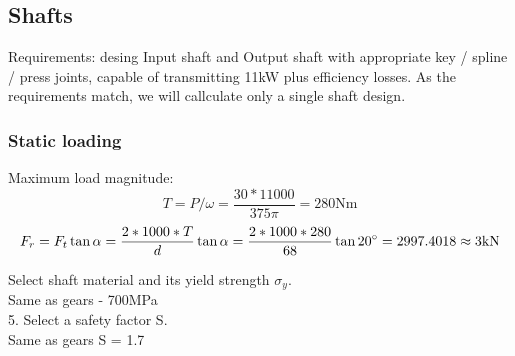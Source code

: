 \documentclass{article}
\begin{document}
\subsection{Shafts}
Requirements: desing Input shaft and Output shaft with appropriate key / spline / press  joints, capable of transmitting 11kW plus efficiency losses.
As the requirements match, we will callculate only a single shaft design.
\subsubsection{Static loading}


Maximum load magnitude: \\
$$T = P / \omega = \frac{30*11000}{375 \pi} = 280 \si{\newton}\si{\meter}$$
$$ F_r = F_t \tan \alpha = \frac{2* 1000* T}{d} \tan \alpha = \frac{2 * 1000 * 280}{68} \tan 20 \degree = 2997.4018 \approx 3 \si{\kilo\newton}$$

Select shaft material and its yield strength $\sigma_y$. \\
Same as gears - 700MPa \\

5. Select a safety factor S. \\
Same as gears S = 1.7 \\
\end{document}
